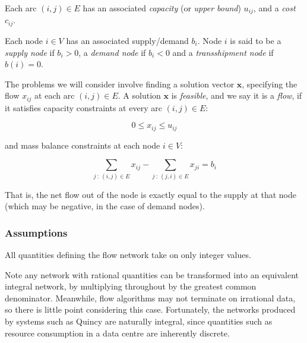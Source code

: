 Each arc $(i,j)\in E$ has an associated \emph{capacity} (or \emph{upper	bound}\footnotemark) $u_{ij}$, and a \emph{cost} $c_{ij}$.

Each node $i\in V$ has an associated supply/demand $b_{i}$. Node $i$ is said to be a \emph{supply node} if $b_{i}>0$, a \emph{demand	node} if $b_{i}<0$ and a \emph{transshipment node} if $b(i)=0$.

The problems we will consider involve finding a solution vector $\mathbf{x}$,
specifying the flow $x_{ij}$ at each arc $(i,j)\in E$. A solution
$\mathbf{x}$ is \emph{feasible}, and we say it is a \emph{flow}, if it satisfies capacity constraints at every arc $(i,j) \in E$:

\begin{equation} \label{eq:capacity-constraints}
0\leq x_{ij}\leq u_{ij}
\end{equation}

and mass balance constraints at each node $i \in V$:

\begin{equation} \label{eq:mass-balance-constraints}
\sum_{j\::\:(i,j)\in E}x_{ij}-\sum_{j\::\:(j,i)\in E}x_{ji}=b_i
\end{equation}

That is, the net flow out of the node is exactly equal to the supply
at that node (which may be negative, in the case of demand nodes).

\subsubsection{Assumptions}

\begin{assumption}[Integrality] \label{assumption:integrality}
All quantities defining the flow network take on only integer values.\\
\end{assumption}
    
\begin{remark} Note any network with rational quantities can be transformed into an equivalent integral network, by multiplying throughout by the greatest common denominator. Meanwhile, flow algorithms may not terminate on irrational data, so there is little point considering this case. Fortunately, the networks produced by systems such as Quincy are naturally integral, since quantities such as resource consumption in a data centre are inherently discrete. \\
\end{remark}

